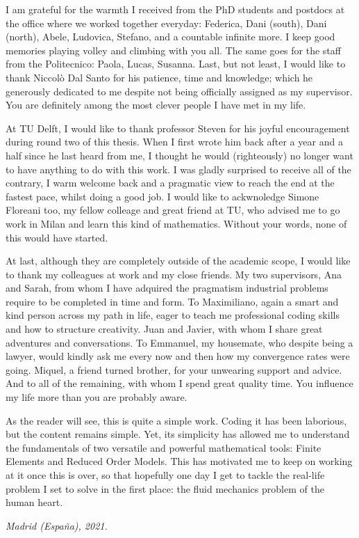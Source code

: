 \documentclass[thesis.tex]{subfiles}
\begin{document}
I am grateful for the warmth I received from the PhD students and postdocs at the office where we worked together everyday: Federica, Dani (south), Dani (north), Abele, Ludovica, Stefano, and a countable infinite more.
I keep good memories playing volley and climbing with you all.
The same goes for the staff from the Politecnico: Paola, Lucas, Susanna.
Last, but not least, I would like to thank Niccolò Dal Santo for his patience, time and knowledge; which he generously dedicated to me despite not being officially assigned as my supervisor. 
You are definitely among the most clever people I have met in my life.

At TU Delft, I would like to thank professor Steven for his joyful encouragement during round two of this thesis.
When I first wrote him back after a year and a half since he last heard from me, I thought he would (righteously) no longer want to have anything to do with this work.
I was gladly surprised to receive all of the contrary, I warm welcome back and a pragmatic view to reach the end at the fastest pace, whilst doing a good job. 
I would like to ackwnoledge Simone Floreani too, my fellow colleage and great friend at TU,
who advised me to go work in Milan and learn this kind of mathematics.
Without your words, none of this would have started.

At last, although they are completely outside of the academic scope, I would like to thank my colleagues at work and my close friends.
My two supervisors, Ana and Sarah, from whom I have adquired the pragmatism industrial problems require to be completed in time and form.
To Maximiliano, again a smart and kind person across my path in life, eager to teach me professional coding skills and how to structure creativity.
Juan and Javier, with whom I share great adventures and conversations.
To Emmanuel, my housemate, who despite being a lawyer, would kindly ask me every now and then how my convergence rates were going.
Miquel, a friend turned brother, for your unwearing support and advice.
And to all of the remaining, with whom I spend great quality time.
You influence my life more than you are probably aware.

As the reader will see, this is quite a simple work.
Coding it has been laborious, but the content remains simple.
Yet, its simplicity has allowed me to understand the fundamentals of 
two versatile and powerful mathematical tools: Finite Elements and Reduced Order Models.
This has motivated me to keep on working at it once this is over, 
so that hopefully one day I get to tackle the real-life problem I set to solve in the first place: 
the fluid mechanics problem of the human heart.

\begin{flushright}
    \vspace{5mm}
    \textit{Madrid (España), 2021.}    
\end{flushright}
\end{document}
